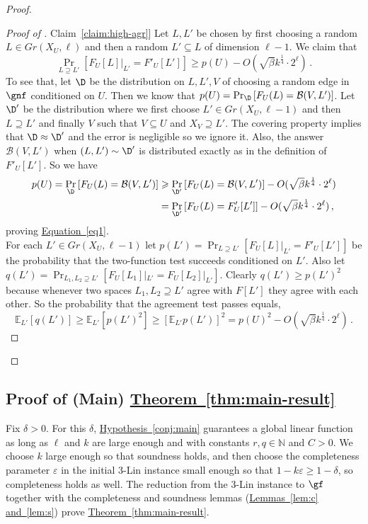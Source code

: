 \documentclass[11pt]{article}
\numberwithin{equation}{section}
\theoremstyle{definition}
\theoremstyle{plain}
\newcommand{\expref}[2]{\hyperref[#2]{#1~\ref{#2}}}
\newcommand{\expeqref}[2]{\hyperref[#2]{#1~\eqref{#2}}}
\newcommand\E{\mathbb{E}}
\newcommand\Prob[2]{{\Pr_{#1}\left[ {#2} \right]}}
\newcommand\eps{\varepsilon}
\renewcommand\geq{\geqslant}
\renewcommand\ge{\geqslant}
\renewcommand\subset{\subseteq}
\renewcommand\supset{\supseteq}
\def\B{\mathcal{B}}
\begin{document}
\begin{proof}
\begin{proof}[Proof of \expref{Claim}{claim:high-agr}]
Let $L,L'$ be chosen by first choosing a random $L\in Gr(X_U,\ell)$ and then a random $L'\subset L$ of dimension $\ell-1$.
We claim that
\begin{equation}\label{eq1} \Prob{L\supset L'}{F_U[L]|_{L'} = F'_U[L'] }\ge p(U)- O(\sqrt{\beta} k^{\frac{1}{4}} \cdot 2^{\ell})\,.
\end{equation}
To see that, let $\D$ be the distribution on $L,L',V$ of choosing a random edge in $\gnf$ conditioned on $U$. Then we know that $p(U) = \Prob{\D}{F_U(L) = \B(V,L')}$.
Let $\D'$ be the distribution where we first choose $L' \in Gr(X_U,\ell-1)$ and then $L\supset L'$ and finally $V$ such that $V\subset U$ and $X_V \supset L'$. The covering property implies that $\D\approx \D'$ and the error is negligible so we ignore it. Also, the answer $\B(V,L')$ when $(L,L')\sim \D'$ is distributed exactly as in the definition of $F'_U[L']$. So we have
\begin{align*}
p(U) = \Prob{\D}{F_U(L) = \B(V,L')}
&\geq \Prob{\D'}{F_U(L) = \B(V,L')} -  O(\sqrt{\beta} k^{\frac{1}{4}} \cdot 2^{\ell})\\
&= \Prob{\D'}{F_U(L) = F_U'[L']} -  O(\sqrt{\beta} k^{\frac{1}{4}} \cdot 2^{\ell})\,,
\end{align*}
proving \expeqref{Equation}{eq1}.\\

For each $L'\in Gr(X_U,\ell-1)$ let $p(L') = \Prob{L\supset L'}{F_U[L]|_{L'} = F'_U[L']}$ be the probability that the two-function test succeeds conditioned on $L'$. Also let $q(L') = \Prob{L_1,L_2\supset L'}{F_U[L_1]|_{L'} = F_U[L_2]|_{L'}}$. %
Clearly $q(L') \ge p(L')^2$ because whenever two spaces $L_1,L_2\supset L'$ agree with $F[L']$ they agree with each other.
So the probability that the agreement test passes equals,
\[ \E_{L'} [q(L')] \ge \E_{L'} [ p(L')^2] \ge [ \E_{L'} p(L') ] ^2 = p(U)^2- O(\sqrt{\beta} k^{\frac{1}{4}} \cdot 2^{\ell})\,.\]
\end{proof}
\end{proof}








\subsection{Proof of (Main) \expref{Theorem}{thm:main-result}}

Fix $\delta>0$. For this $\delta$, \expref{Hypothesis}{conj:main} guarantees a global linear function as long as $\ell$ and $k$ are large enough and with constants $r,q\in \mathbb{N}$ and $C>0$. We choose $k$ large enough so that soundness holds, and then choose the completeness parameter $\eps$ in the initial 3-Lin instance small enough so that $1-k\eps \ge 1-\delta$, so completeness holds as well. The reduction from the 3-Lin instance to $\gf$ together with the completeness and soundness lemmas (\expref{Lemmas}{lem:c} \expref{and}{lem:s}) prove \expref{Theorem}{thm:main-result}.
\end{document}
